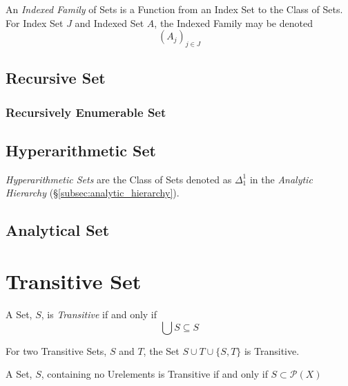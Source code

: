 \documentclass{article}
\begin{document}
An \emph{Indexed Family} of Sets is a Function from an Index Set to
the Class of Sets. For Index Set $J$ and Indexed Set $A$, the Indexed
Family may be denoted
\[
    (A_j)_{j \in J}
\]

\subsection{Recursive Set}\label{subsec:recursive_set}

\subsubsection{Recursively Enumerable Set}\label{subsec:recursively_enumerable}

\subsection{Hyperarithmetic Set}\label{subsec:hyperarithmetic_set}

\emph{Hyperarithmetic Sets} are the Class of Sets denoted as
$\Delta^1_1$ in the \emph{Analytic Hierarchy}
(\S\ref{subsec:analytic_hierarchy}).

\subsection{Analytical Set}\label{subsec:analytical_set}




\section{Transitive Set}\label{sec:transitive_set}

A Set, $S$, is \emph{Transitive} if and only if
\[
    \bigcup S \subseteq S
\]

For two Transitive Sets, $S$ and $T$, the Set $S \cup T \cup \{S,T\}$
is Transitive.

A Set, $S$, containing no Urelements is Transitive if and only if $S
\subset \mathcal{P}(X)$
\end{document}
